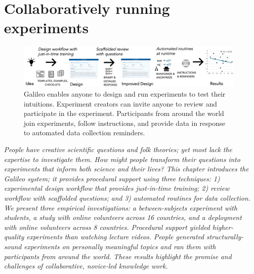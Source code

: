 
\chapter{Collaboratively running experiments}

\begin{figure}[h] 
  \centering
  \includegraphics[width=1.0\textwidth]{figures/galileo/galileo-1}
  \caption[Galileo enables anyone to design and run experiments to test their intuitions]
{Galileo enables anyone to design and run experiments to test their intuitions. Experiment creators can invite anyone to review and participate in the experiment. Participants from around the world join experiments, follow instructions, and provide data in response to automated data collection reminders.}
  \label{fig:galileo-1}
\end{figure}

\textit{People have creative scientific questions and folk theories;
yet most lack the expertise to investigate them. How might
people transform their questions into experiments that
inform both science and their lives? This chapter introduces
the Galileo system; it provides procedural support using
three techniques: 1) experimental design workflow that
provides just-in-time training; 2) review workflow with
scaffolded questions; and 3) automated routines for data
collection. We present three empirical investigations: a
between-subjects experiment with students, a study with
online volunteers across 16 countries, and a deployment
with online volunteers across 8 countries. Procedural
support yielded higher-quality experiments than watching
lecture videos. People generated structurally-sound experiments
on personally meaningful topics and ran them with
participants from around the world. These results highlight
the promise and challenges of collaborative, novice-led
knowledge work.}

